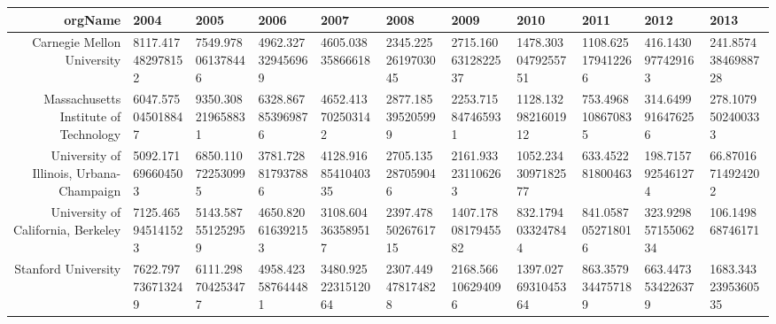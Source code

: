 \documentclass[11pt, oneside]{article}   	%
\begin{document}
\begin{tabular}{|r|l|l|l|l|l|l|l|l|l|l|}\hline
orgName & 2004 & 2005 & 2006 & 2007 & 2008 & 2009 & 2010 & 2011 & 2012 & 2013\\\hline
Carnegie Mellon University & 8117.417482978152 & 7549.978061378446 & 4962.327329456969 & 4605.03835866618 & 2345.2252619703045 & 2715.1606312822537 & 1478.3030479255751 & 1108.625179412266 & 416.1430977429163 & 241.85743846988728 \\\hline 
Massachusetts Institute of Technology & 6047.575045018847 & 9350.308219658831 & 6328.867853969876 & 4652.413702503142 & 2877.185395205999 & 2253.715847465931 & 1128.1329821601912 & 753.4968108670835 & 314.6499916476256 & 278.1079502400333 \\\hline 
University of Illinois, Urbana-Champaign & 5092.171696604503 & 6850.110722530995 & 3781.728817937886 & 4128.9168541040335 & 2705.135287059046 & 2161.933231106263 & 1052.2343097182577 & 633.452281800463 & 198.7157925461274 & 66.87016714924202 \\\hline 
University of California, Berkeley & 7125.465945141523 & 5143.587551252959 & 4650.820616392153 & 3108.604363589517 & 2397.4785026761715 & 1407.1780817945582 & 832.1794033247844 & 841.0587052718016 & 323.92985715506234 & 106.149868746171 \\\hline 
Stanford University & 7622.797736713249 & 6111.298704253477 & 4958.423587644481 & 3480.9252231512064 & 2307.449478174828 & 2168.566106294096 & 1397.0276931045364 & 863.3579344757189 & 663.4473534226379 & 1683.3432395360535 \\\hline 
\end{tabular}
\end{document}
